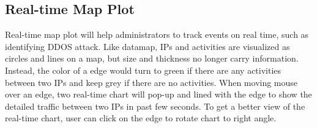 \subsection{Real-time Map Plot}
Real-time map plot will help administrators to track events on real time, such as identifying DDOS attack. Like datamap, IPs and activities are visualized as circles and lines on a map, but size and thickness no longer carry information. Instead, the color of a edge would turn to green if there are any activities between two IPs and keep grey if there are no activities. When moving mouse over an edge, two real-time chart will pop-up and lined with the edge to show the detailed traffic between two IPs in past few seconds. To get a better view of the real-time chart, user can click on the edge to rotate chart to right angle.
